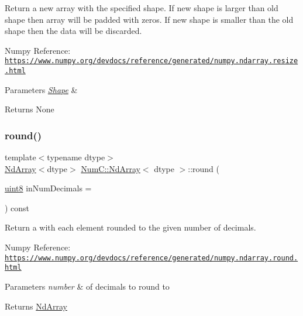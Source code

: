 Return a new array with the specified shape. If new shape is larger than old shape then array will be padded with zeros. If new shape is smaller than the old shape then the data will be discarded.

Numpy Reference\+: \href{https://www.numpy.org/devdocs/reference/generated/numpy.ndarray.resize.html}{\tt https\+://www.\+numpy.\+org/devdocs/reference/generated/numpy.\+ndarray.\+resize.\+html}


\begin{DoxyParams}{Parameters}
{\em \mbox{\hyperlink{class_num_c_1_1_shape}{Shape}}} & \\
\hline
\end{DoxyParams}
\begin{DoxyReturn}{Returns}
None 
\end{DoxyReturn}
\mbox{\label{class_num_c_1_1_nd_array_ac083fe73fd750871618990f44b3a854d}} 
\subsubsection{\texorpdfstring{round()}{round()}}
{\footnotesize\ttfamily template$<$typename dtype$>$ \\
\mbox{\hyperlink{class_num_c_1_1_nd_array}{Nd\+Array}}$<$dtype$>$ \mbox{\hyperlink{class_num_c_1_1_nd_array}{Num\+C\+::\+Nd\+Array}}$<$ dtype $>$\+::round (\begin{DoxyParamCaption}\item[{\mbox{\hyperlink{namespace_num_c_a60b2e2f49e1ff61059731c154e560869}{uint8}}}]{in\+Num\+Decimals = {} }\end{DoxyParamCaption}) const\hspace{0.3cm}{\ttfamily [inline]}}

Return a with each element rounded to the given number of decimals.

Numpy Reference\+: \href{https://www.numpy.org/devdocs/reference/generated/numpy.ndarray.round.html}{\tt https\+://www.\+numpy.\+org/devdocs/reference/generated/numpy.\+ndarray.\+round.\+html}


\begin{DoxyParams}{Parameters}
{\em number} & of decimals to round to \\
\hline
\end{DoxyParams}
\begin{DoxyReturn}{Returns}
\mbox{\hyperlink{class_num_c_1_1_nd_array}{Nd\+Array}} 
\end{DoxyReturn}
\mbox{\label{class_num_c_1_1_nd_array_aa73e539af091f6a8f4830300101cd50b}} 

